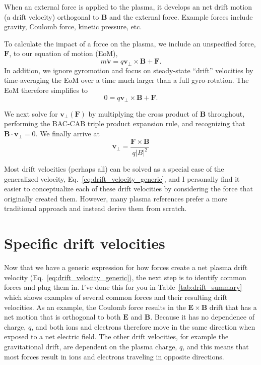 \documentclass[12pt]{iopart}
\begin{document}
When an external force is applied to the plasma, it develops an net drift motion (a drift velocity) orthogonal to $\mathbf{B}$ and the external force.  Example forces include gravity, Coulomb force, kinetic pressure, etc.  

To calculate the impact of a force on the plasma, we include an unspecified force, $\mathbf{F}$, to our equation of motion (EoM),
\begin{equation*}
m \dot{\mathbf{v}} = q \mathbf{v}_\perp \times \mathbf{B} + \mathbf{F}.
\end{equation*}
In addition, we ignore gyromotion and focus on steady-state ``drift'' velocities by time-averaging the EoM over a time much larger than a full gyro-rotation.  The EoM therefore simplifies to
\begin{equation*}
0 = q \mathbf{v}_\perp \times \mathbf{B} + \mathbf{F}.
\end{equation*}

We next solve for $\mathbf{v}_\perp (\mathbf{F})$ by multiplying the cross product of $\mathbf{B}$ throughout, performing the BAC-CAB triple product expansion rule, and recognizing that $\mathbf{B} \cdot \mathbf{v}_\perp = 0$.  We finally arrive at 
\begin{equation}
\label{eq:drift_velocity_generic}
\mathbf{v}_\perp = \frac{\mathbf{F} \times \mathbf{B}}{q \left | B \right|^2}
\end{equation}

Most drift velocities (perhaps all) can be solved as a special case of the generalized velocity, Eq.~\ref{eq:drift_velocity_generic}, and I personally find it easier to conceptualize each of these drift velocities by considering the force that originally created them.  However, many plasma references prefer a more traditional approach and instead derive them from scratch.  


\section{Specific drift velocities}

Now that we have a generic expression for how forces create a net plasma drift velocity (Eq.~\ref{eq:drift_velocity_generic}), the next step is to identify common forces and plug them in.  I've done this for you in Table~\ref{tab:drift_summary} which shows examples of several common forces and their resulting drift velocities.  As an example, the Coulomb force results in the $\mathbf{E} \times \mathbf{B} $ drift that has a net motion that is orthogonal to both $\mathbf{E}$ and $\mathbf{B}$.  Because it has no dependence of charge, $q$, and both ions and electrons therefore move in the same direction when exposed to a net electric field.  The other drift velocities, for example the gravitational drift, are dependent on the plasma charge, $q$, and this means that most forces result in ions and electrons traveling in opposite directions.  
\end{document}
